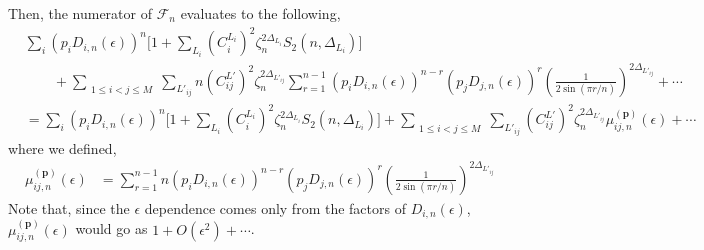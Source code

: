 \documentclass[11pt]{article}
\newcommand{\ep}{\epsilon}
\newcommand{\nn}{\nonumber}
\newcommand{\lb}{\left(}
\newcommand{\rb}{\right)}
\begin{document}
Then, the numerator of $\mathcal{F}_n$ evaluates to the following,
\begin{align}
    &\sum_i  \lb p_iD_{i,n}(\ep)\rb^n \big[  1+ \sum_{L_i}{(C_i^{L_i})}^2 \zeta_n^{2\Delta_{L_i}}S_2(n,\Delta_{L_i})\big] \nn \\&\qquad + \displaystyle\sum_{\substack{1\leq i<j\leq M}}\sum_{L'_{ij}}n\lb C_{ij}^{L'}\rb^2 \zeta_n^{2\Delta_{L'_{ij}}}\sum_{r=1}^{n-1} \lb p_iD_{i,n}(\ep)\rb ^{n-r}\lb p_j D_{j,n}(\ep)\rb ^r \lb\frac{1}{2\sin (\pi r/n)}\rb^{2\Delta_{L'_{ij}}} + \cdots \\
    &=\sum_i  \lb p_iD_{i,n}(\ep)\rb^n \big[  1+ \sum_{L_i}{(C_i^{L_i})}^2 \zeta_n^{2\Delta_{L_i}} S_2(n,\Delta_{L_i})\big] + \displaystyle\sum_{\substack{1\leq i<j\leq M}}\sum_{L'_{ij}}\lb C_{ij}^{L'}\rb^2 \zeta_n^{2\Delta_{L'_{ij}}} \mu_{ij,n}^{(\textbf{p})}(\ep) + \cdots 
\end{align}
where we defined,
\begin{align}    
    \mu_{ij,n}^{(\textbf{p})}(\ep) &= \sum_{r=1}^{n-1} n\lb p_iD_{i,n}(\ep)\rb ^{n-r}\lb p_j D_{j,n}(\ep)\rb ^r  \lb\frac{1}{2\sin (\pi r/n)}\rb^{2\Delta_{L'_{ij}}} 
\end{align}
Note that, since the $\ep$ dependence comes only from the factors of $D_{i,n}(\ep)$, $\mu_{ij,n}^{(\textbf{p})}(\ep)$ would go as $1+ O(\ep^2) + \cdots$. 
\end{document}
